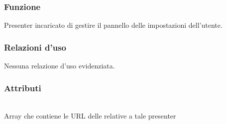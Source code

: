 \subsubsection*{Funzione}
Presenter incaricato di gestire il pannello delle impostazioni dell'utente.

\subsubsection*{Relazioni d'uso}
Nessuna relazione d'uso evidenziata.

\subsubsection*{Attributi}
\begin{description}
\item{}\\
Array che contiene le URL delle  relative a tale presenter
\end{description}

